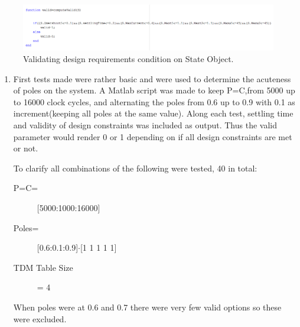 \begin{figure}[h!]
	\begin{center}
		\includegraphics[width=1.1\linewidth]{img/valid}
		\caption{Validating design requirements condition on State Object.}
		\label{fig:valid}
	\end{center}
\end{figure}



\begin{enumerate}
	\item First tests made were rather basic and were used to determine the acuteness of poles on the system. A Matlab script was made to keep P=C,from 5000 up to 16000 clock cycles, and alternating the poles from 0.6 up to 0.9 with 0.1 as increment(keeping all poles at the same value). Along each test, settling time and validity of design constraints was included as output. Thus the valid parameter would render 0 or 1 depending on if all design constraints are met or not.
	
	To clarify all combinations of the following were tested, 40 in total:
	\begin{description}
		\item[P=C=] [5000:1000:16000]
		\item[Poles=] [0.6:0.1:0.9]$\cdot$[1 1 1 1 1]
		\item[TDM Table Size] = 4
	\end{description}
	When poles were at 0.6 and 0.7 there were very few valid options so these were excluded.
	

\end{enumerate}
